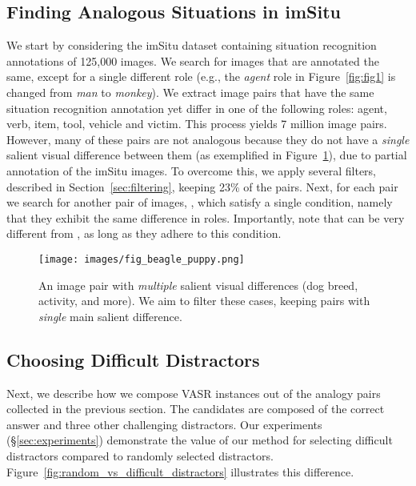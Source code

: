 \documentclass[letterpaper]{article} \usepackage{aaai23}  \usepackage{times}  \usepackage{helvet}  \usepackage{courier}  \usepackage[hyphens]{url}  \usepackage{graphicx} \urlstyle{rm} \def\UrlFont{\rm}  \usepackage{natbib}  \usepackage{caption} \frenchspacing  \setlength{\pdfpagewidth}{8.5in}  \setlength{\pdfpageheight}{11in}  \usepackage{algorithm}
\begin{document}
\subsection{Finding Analogous Situations in imSitu}
\label{sec:finding_analogies}

We start by considering the imSitu dataset containing situation recognition annotations of 125,000 images. We search for images  that are annotated the same, except for a single different role (e.g., the \emph{agent} role in Figure~\ref{fig:fig1} is changed from \emph{man} to \emph{monkey}). We extract image pairs that
have the same situation recognition annotation yet differ in one of the following roles: agent, verb, item, tool, vehicle and victim. This process yields 7 million image pairs. However, many of these pairs are not analogous because they do not have a \emph{single} salient visual difference between them (as exemplified in Figure~\ref{fig:fig_beagle_puppy}), due to partial annotation of the imSitu images. To overcome this, we apply several filters, described in Section~\ref{sec:filtering}, keeping 23\% of the pairs. Next, for each  pair we search for another pair of images, , which satisfy a single condition, namely that they exhibit the same difference in roles. Importantly, note that  can be very different from , as long as they adhere to this condition. 

\begin{figure}[!tb]
\centering
    \texttt{[image: images/fig\_beagle\_puppy.png]}\\
    \caption{An image pair with \emph{multiple} salient visual differences (dog breed, activity, and more). We aim to filter these cases, keeping pairs with \emph{single} main salient difference.}
    \label{fig:fig_beagle_puppy}
\end{figure}

\subsection{Choosing Difficult Distractors}
\label{sec:distractors}
Next, we describe how we compose VASR instances out of the analogy pairs collected in the previous section. The candidates are composed of the correct answer  and three other challenging distractors. Our experiments (\S\ref{sec:experiments}) demonstrate the value of our method for selecting difficult distractors compared to randomly selected distractors. Figure~\ref{fig:random_vs_difficult_distractors} illustrates this difference.
\end{document}
